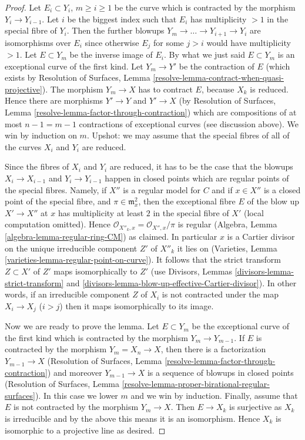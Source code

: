 \begin{proof}
\medskip\noindent
Let $E_i \subset Y_i$, $m \geq i \geq 1$ be the curve which is contracted
by the morphism $Y_i \to Y_{i - 1}$. Let $i$ be the biggest index such
that $E_i$ has multiplicity $> 1$ in the special fibre of $Y_i$.
Then the further blowups $Y_m \to \ldots \to Y_{i + 1} \to Y_i$
are isomorphisms over $E_i$ since otherwise $E_j$ for some $j > i$
would have multiplicity $> 1$. Let $E \subset Y_m$ be the inverse
image of $E_i$. By what we just said $E \subset Y_m$ is an
exceptional curve of the first kind. Let $Y_m \to Y'$ be the
contraction of $E$ (which exists by Resolution of Surfaces, Lemma
\ref{resolve-lemma-contract-when-quasi-projective}). The morphism
$Y_m \to X$ has to contract $E$, because $X_k$ is reduced.
Hence there are morphisms $Y' \to Y$ and $Y' \to X$ (by
Resolution of Surfaces, Lemma
\ref{resolve-lemma-factor-through-contraction})
which are compositions of at most $n - 1 = m - 1$ contractions
of exceptional curves (see discussion above). We win by induction on $m$.
Upshot: we may assume that the special fibres of all of
the curves $X_i$ and $Y_i$ are reduced.

\medskip\noindent
Since the fibres of $X_i$ and $Y_i$ are reduced, it has to be the
case that the blowups $X_i \to X_{i - 1}$ and $Y_i \to Y_{i - 1}$
happen in closed points which are regular points of the special fibres.
Namely, if $X''$ is a regular model for $C$ and if $x \in X''$
is a closed point of the special fibre, and
$\pi \in \mathfrak m_x^2$, then the exceptional fibre $E$ of the
blow up $X' \to X''$ at $x$ has multiplicity at least $2$ in the
special fibre of $X'$ (local computation omitted).
Hence $\mathcal{O}_{X''_k, x} = \mathcal{O}_{X'', x}/\pi$ is
regular (Algebra, Lemma \ref{algebra-lemma-regular-ring-CM}) as claimed.
In particular $x$ is a Cartier divisor on the unique
irreducible component $Z'$ of $X''_k$ it lies on
(Varieties, Lemma \ref{varieties-lemma-regular-point-on-curve}).
It follows that the strict transform $Z \subset X'$ of $Z'$
maps isomorphically to $Z'$
(use Divisors, Lemmas \ref{divisors-lemma-strict-transform} and
\ref{divisors-lemma-blow-up-effective-Cartier-divisor}).
In other words, if an irreducible component $Z$ of $X_i$
is not contracted under the map $X_i \to X_j$ ($i > j$)
then it maps isomorphically to its image.

\medskip\noindent
Now we are ready to prove the lemma.
Let $E \subset Y_m$ be the exceptional curve of the first kind
which is contracted by the morphism $Y_m \to Y_{m - 1}$. If $E$ is
contracted by the morphism $Y_m = X_n \to X$, then there is a factorization
$Y_{m - 1} \to X$ (Resolution of Surfaces, Lemma
\ref{resolve-lemma-factor-through-contraction})
and moreover $Y_{m - 1} \to X$ is a sequence of blowups
in closed points (Resolution of Surfaces, Lemma
\ref{resolve-lemma-proper-birational-regular-surfaces}).
In this case we lower $m$ and we win by induction.
Finally, assume that $E$ is not contracted by the morphism $Y_m \to X$.
Then $E \to X_k$ is surjective as $X_k$ is irreducible
and by the above this means it is an isomorphism.
Hence $X_k$ is isomorphic to a projective line as desired.
\end{proof}





